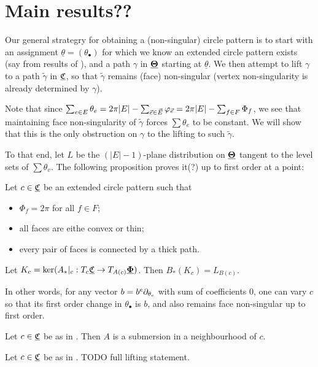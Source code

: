 \section{Main results??}


Our general strategry for obtaining a (non-singular) circle pattern
is to start with an assignment $\underline{\theta} = (\theta_\bullet)$
for which we know an extended circle pattern exists
(say from results of ),
and a path $\gamma$ in ${\underline{\mathbf{\Theta}}}$ starting at $\underline{\theta}$.
We then attempt to lift $\gamma$ to a path $\tilde{\gamma}$ in ${\underline{\mathfrak{C}}}$,
so that $\tilde{\gamma}$ remains (face) non-singular
(vertex non-singularity is already determined by $\gamma$).

Note that since $\sum_{e\in E} \theta_e
= 2\pi |E| - \sum_{\vec{e} \in \vec{E}} \varphi_{\vec{e}}
= 2\pi |E| - \sum_{f\in F} \Phi_f$,
we see that maintaining face non-singularity of $\tilde{\gamma}$
forces $\sum \theta_e$ to be constant.
We will show that this is the only obstruction on $\gamma$
to the lifting to such $\tilde{\gamma}$.

To that end, let $L$ be the $(|E|-1)$-plane distribution on ${\underline{\mathbf{\Theta}}}$
tangent to the level sets of $\sum \theta_v$.
The following proposition proves it(?) up to first order at a point:


\begin{proposition}
\label{p:point_lift}
Let $c \in {\underline{\mathfrak{C}}}$ be an extended circle pattern such that
\begin{itemize}
	\item $\Phi_f = 2\pi$ for all $f\in F$;
	\item all faces are eithe convex or thin;
	\item every pair of faces is connected by a thick path.
\end{itemize}
Let $K_c = \ker (A_*|_c : T_c {\underline{\mathfrak{C}}} \to T_{A(c)} {\underline{\mathbf{\Phi}}})$.
Then $B_*(K_c) = L_{B(c)}$.

In other words, for any vector $b = b^e \partial_{\theta_e}$
with sum of coefficients 0, one can vary $c$ so that its
first order change in $\theta_\bullet$ is $b$,
and also remains face non-singular up to first order.
\end{proposition}


\begin{lemma}
Let $c \in {\underline{\mathfrak{C}}}$ be as in .
Then $A$ is a submersion in a neighbourhood of $c$.
\end{lemma}

\begin{proposition}
Let $c\in {\underline{\mathfrak{C}}}$ be as in .
TODO full lifting statement.
\end{proposition}


